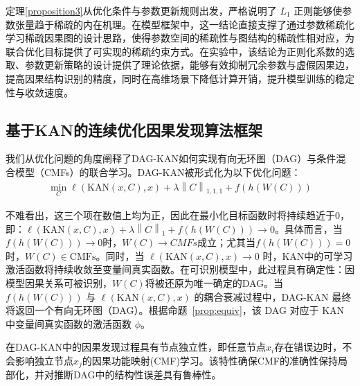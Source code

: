 定理\ref{proposition3}从优化条件与参数更新规则出发，严格说明了 \(L_1\) 正则能够使参数张量趋于稀疏的内在机理。在模型框架中，这一结论直接支撑了通过参数稀疏化学习稀疏因果图的设计思路，使得参数空间的稀疏性与图结构的稀疏性相对应，为联合优化目标提供了可实现的稀疏约束方式。在实验中，该结论为正则化系数的选取、参数更新策略的设计提供了理论依据，能够有效抑制冗余参数与虚假因果边，提高因果结构识别的精度，同时在高维场景下降低计算开销，提升模型训练的稳定性与收敛速度。

\subsection{基于KAN的连续优化因果发现算法框架}\label{3.2.4}

我们从优化问题的角度阐释了DAG-KAN如何实现有向无环图（DAG）与条件混合模型（CMFs）的联合学习。DAG-KAN被形式化为以下优化问题：
\begin{equation}
	\begin{aligned}
		\underset{C}{\min}\ell \left( \mathrm{KAN}\left( x,C \right) ,x \right) +\lambda \left\| C \right\| _{1,1,1}+f\left( h\left( W\left( C \right) \right) \right)
	\end{aligned}\label{eq4-6}
\end{equation}

不难看出，这三个项在数值上均为正，因此在最小化目标函数时将持续趋近于0，即：$\ell \left( \mathrm{KAN}\left( x,C \right) ,x \right) +\lambda \left\| C \right\| _1+f\left( h\left( W\left( C \right) \right) \right) \rightarrow 0$。具体而言，当$f\left( h\left( W\left( C \right) \right) \right) \rightarrow 0$时，$W\left( C \right) \rightarrow CMFs$成立；尤其当$f\left( h\left( W\left( C \right) \right) \right) =0$时，$W\left( C \right) \in \mathrm{CMFs}$。同时，当 $\ell \left( \mathrm{KAN}\left( x,C \right) ,x \right) \rightarrow 0$ 时，KAN中的可学习激活函数将持续收敛至变量间真实函数。在可识别模型中，此过程具有确定性：因模型因果关系可被识别，$W\left( C \right) $将被还原为唯一确定的DAG。当$f\left( h\left( W\left( C \right) \right) \right)$ 与 $\ell \left( \mathrm{KAN}\left( x,C \right) ,x \right) $ 的耦合衰减过程中，DAG-KAN 最终将返回一个有向无环图（DAG）。根据命题~\ref{prop:equiv}，该 DAG 对应于 KAN 中变量间真实函数的激活函数 $\phi $。

\begin{theorem}[因果函数映射学习的节点独立性]
	\label{proposition4}
	在DAG-KAN中的因果发现过程具有节点独立性，即任意节点$x_i$存在错误边时，不会影响独立节点$x_j$的因果功能映射(CMF)学习。该特性确保CMF的准确性保持局部化，并对推断DAG中的结构性误差具有鲁棒性。
\end{theorem}

